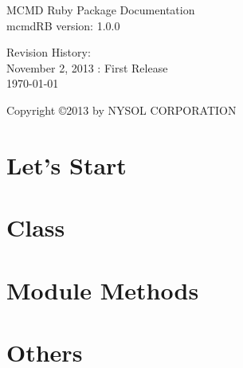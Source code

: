 \documentclass[a4paper]{book}
\begin{document}
\begin{titlepage}
\begin{center}
{\huge MCMD Ruby Package Documentation}\\
\vspace{10truept}
{\normalsize mcmdRB version: 1.0.0}\\
\vspace{1cm}

Revision History:\\
November 2, 2013 : First Release\\
\vspace{18cm}
{\small \today}

{\small Copyright \copyright 2013 by NYSOL CORPORATION}
\end{center}
\end{titlepage}

\setcounter{tocdepth}{1}
\tableofcontents


%

%

%

\chapter{Let's Start}



\chapter{Class}






\chapter{Module Methods}








\chapter{Others}

%

%
%
\end{document}
